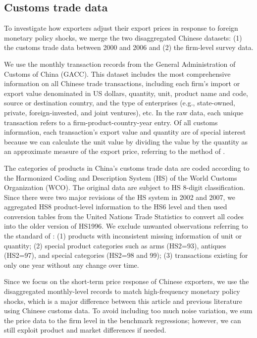 \subsection{Customs trade data}

To investigate how exporters adjust their export prices in response to foreign monetary policy shocks, we merge the two disaggregated Chinese datasets: (1) the customs trade data between 2000 and 2006 and (2) the firm-level survey data.

We use the monthly transaction records from the General Administration of Customs of China (GACC). This dataset includes the most comprehensive information on all Chinese trade transactions, including each firm's import or export value denominated in US dollars, quantity, unit, product name and code, source or destination country, and the type of enterprises (e.g., state-owned, private, foreign-invested, and joint ventures), etc. In the raw data, each unique transaction refers to a firm-product-country-year entry. Of all customs information, each transaction's export value and quantity are of special interest because we can calculate the unit value by dividing the value by the quantity as an approximate measure of the export price, referring to the method of \cite{deloecker2012markups}. 

The categories of products in China's customs trade data are coded according to the Harmonized Coding and Description System (HS) of the World Customs Organization (WCO). The original data are subject to HS 8-digit classification. Since there were two major revisions of the HS system in 2002 and 2007, we aggregated HS8 product-level information to the HS6 level and then used conversion tables from the United Nations Trade Statistics to convert all codes into the older version of HS1996. We exclude unwanted observations referring to the standard of \cite{li2015exchange}: (1) products with inconsistent missing information of unit or quantity; (2) special product categories such as arms (HS2=93), antiques (HS2=97), and special categories (HS2=98 and 99); (3) transactions existing for only one year without any change over time.

Since we focus on the short-term price response of Chinese exporters, we use the disaggregated monthly-level records to match high-frequency monetary policy shocks, which is a major difference between this article and previous literature using Chinese customs data. To avoid including too much noise variation, we sum the price data to the firm level in the benchmark regressions; however, we can still exploit product and market differences if needed.


